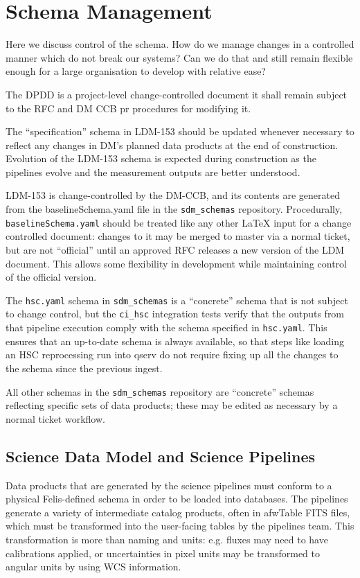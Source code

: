 \section{Schema Management}

Here we discuss control of the schema.
How do we manage changes in a controlled manner which do not break our systems?
Can we do that and still remain flexible enough for a large organisation to develop with relative ease?

The DPDD is a project-level change-controlled document it shall remain subject to the RFC and DM CCB pr procedures for modifying it.

The ``specification'' schema in LDM-153 should be updated whenever necessary to reflect any changes
in DM's planned data products at the end of construction. Evolution of the LDM-153 schema is
expected during construction as the pipelines evolve and the measurement outputs are better
understood.

LDM-153 is change-controlled by the DM-CCB, and its contents are generated from the baselineSchema.yaml file
in the \texttt{sdm\_schemas} repository. Procedurally, \texttt{baselineSchema.yaml} should be
treated like any other LaTeX input for a change controlled document: changes to it may be merged to
master via a normal ticket, but are not ``official'' until an approved RFC releases a new version of
the LDM document.  This allows some flexibility in development while maintaining control of the official version.

The \texttt{hsc.yaml} schema in \texttt{sdm\_schemas} is a ``concrete'' schema that is not subject
to change control, but the \texttt{ci\_hsc} integration tests verify that the outputs from that
pipeline execution comply with the schema specified in \texttt{hsc.yaml}. This ensures that an
up-to-date schema is always available, so that steps like loading an HSC reprocessing run into qserv
do not require fixing up all the changes to the schema since the previous ingest.

All other schemas in the \texttt{sdm\_schemas} repository are ``concrete'' schemas reflecting
specific sets of data products; these may be edited as necessary by a normal ticket workflow.


\subsection{Science Data Model and Science Pipelines}
Data products that are generated by the science pipelines must conform to a physical Felis-defined
schema in order to be loaded into databases. The pipelines generate a variety of intermediate
catalog products, often in afwTable FITS files, which must be transformed into the user-facing
tables by the pipelines team. This transformation is more than naming and units: e.g. fluxes may
need to have calibrations applied, or uncertainties in pixel units may be transformed to angular
units by using WCS information.

